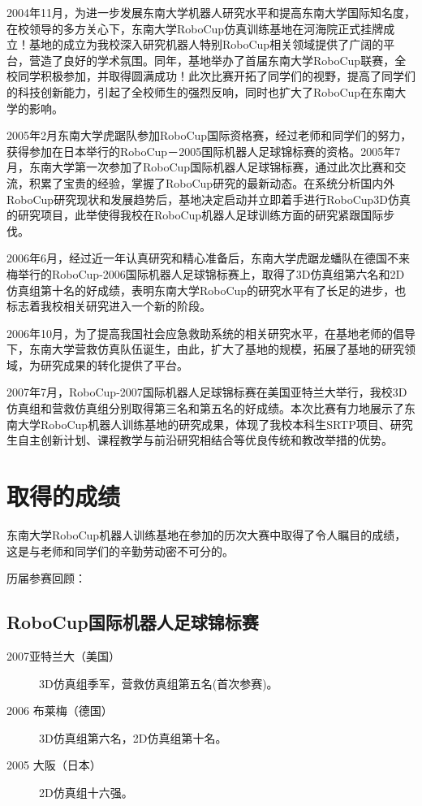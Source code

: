 2004年11月，为进一步发展东南大学机器人研究水平和提高东南大学国际知名度，在校领导的多方关心下，东南大学RoboCup仿真训练基地在河海院正式挂牌成立！基地的成立为我校深入研究机器人特别RoboCup相关领域提供了广阔的平台，营造了良好的学术氛围。同年，基地举办了首届东南大学RoboCup联赛，全校同学积极参加，并取得圆满成功！此次比赛开拓了同学们的视野，提高了同学们的科技创新能力，引起了全校师生的强烈反响，同时也扩大了RoboCup在东南大学的影响。

2005年2月东南大学虎踞队参加RoboCup国际资格赛，经过老师和同学们的努力，获得参加在日本举行的RoboCup－2005国际机器人足球锦标赛的资格。2005年7月，东南大学第一次参加了RoboCup国际机器人足球锦标赛，通过此次比赛和交流，积累了宝贵的经验，掌握了RoboCup研究的最新动态。在系统分析国内外RoboCup研究现状和发展趋势后，基地决定启动并立即着手进行RoboCup3D仿真的研究项目，此举使得我校在RoboCup机器人足球训练方面的研究紧跟国际步伐。

2006年6月，经过近一年认真研究和精心准备后，东南大学虎踞龙蟠队在德国不来梅举行的RoboCup-2006国际机器人足球锦标赛上，取得了3D仿真组第六名和2D仿真组第十名的好成绩，表明东南大学RoboCup的研究水平有了长足的进步，也标志着我校相关研究进入一个新的阶段。

2006年10月，为了提高我国社会应急救助系统的相关研究水平，在基地老师的倡导下，东南大学营救仿真队伍诞生，由此，扩大了基地的规模，拓展了基地的研究领域，为研究成果的转化提供了平台。

2007年7月，RoboCup-2007国际机器人足球锦标赛在美国亚特兰大举行，我校3D仿真组和营救仿真组分别取得第三名和第五名的好成绩。本次比赛有力地展示了东南大学RoboCup机器人训练基地的研究成果，体现了我校本科生SRTP项目、研究生自主创新计划、课程教学与前沿研究相结合等优良传统和教改举措的优势。

\section{取得的成绩}
东南大学RoboCup机器人训练基地在参加的历次大赛中取得了令人瞩目的成绩，这是与老师和同学们的辛勤劳动密不可分的。

历届参赛回顾：

\subsection{RoboCup国际机器人足球锦标赛}
\begin{description}
\item[2007亚特兰大（美国）] 3D仿真组季军，营救仿真组第五名(首次参赛)。
\item[2006 布莱梅（德国）] 3D仿真组第六名，2D仿真组第十名。
\item[2005 大阪（日本）] 2D仿真组十六强。
\end{description}

